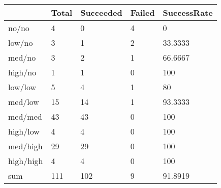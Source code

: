 \begin{tabular}{lllll}
& Total & Succeeded & Failed & SuccessRate \\ 
\hline 
no/no & 4 & 0 & 4 & 0 \\ 
low/no & 3 & 1 & 2 & 33.3333 \\ 
med/no & 3 & 2 & 1 & 66.6667 \\ 
high/no & 1 & 1 & 0 & 100 \\ 
low/low & 5 & 4 & 1 & 80 \\ 
med/low & 15 & 14 & 1 & 93.3333 \\ 
med/med & 43 & 43 & 0 & 100 \\ 
high/low & 4 & 4 & 0 & 100 \\ 
med/high & 29 & 29 & 0 & 100 \\ 
high/high & 4 & 4 & 0 & 100 \\ 
sum & 111 & 102 & 9 & 91.8919 \\ 
\hline 
\end{tabular}